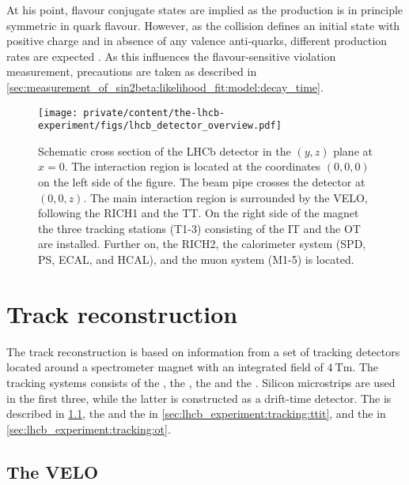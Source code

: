 At his point, flavour conjugate states are implied as the production is in
principle symmetric in quark flavour. However, as the \protonproton collision
defines an initial state with positive charge and in absence of any valence
anti-quarks, different production rates are expected
\cite{Chaichian:1993rh,Norrbin:2000zc,Norrbin:2000jy}. As this influences the
flavour-sensitive \CP violation measurement, precautions are taken as described
in \cref{sec:measurement_of_sin2beta:likelihood_fit:model:decay_time}.
%
\begin{figure}[t]
  \centering
    \texttt{[image: private/content/the-lhcb-experiment/figs/lhcb\_detector\_overview.pdf]}
  \caption{
    Schematic cross section of the \acs{LHCb} detector in the $(y,z)$ plane at
  $x=0$. The \protonproton interaction region is located at the coordinates
  $(0,0,0)$ on the left side of the figure. The beam pipe crosses the detector at
  $(0,0,z)$. The main interaction region is surrounded by the \acs*{VELO},
  following the \acs*{RICH}1 and the \acs*{TT}. On the right side of the magnet
  the three tracking stations (T1-3) consisting of the \acs*{IT} and the
  \acs*{OT} are installed. Further on, the \acs*{RICH}2, the calorimeter system
  (\acs*{SPD}, \acs*{PS}, \acs*{ECAL}, and \acs*{HCAL}), and the muon system
  (M1-5) is located. }
  \label{fig:lhcb_experiment:detector:overview}
\end{figure}

\section{Track reconstruction}
\label{sec:lhcb_experiment:tracking}

The \LHCb track reconstruction is based on information from a set of tracking
detectors located around a spectrometer magnet with an integrated field of
$\SI{4}{\tesla\metre}$. The tracking systems consists of the \VELO, the \TT, the
\IT and the \OT. Silicon microstrips are used in the first three, while the
latter is constructed as a drift-time detector. The \VELO is described in
\cref{sec:lhcb_experiment:tracking:velo}, the \TT and the \IT in
\cref{sec:lhcb_experiment:tracking:ttit}, and the \OT in
\cref{sec:lhcb_experiment:tracking:ot}.

\subsection{The \acl*{VELO}}
\label{sec:lhcb_experiment:tracking:velo}

